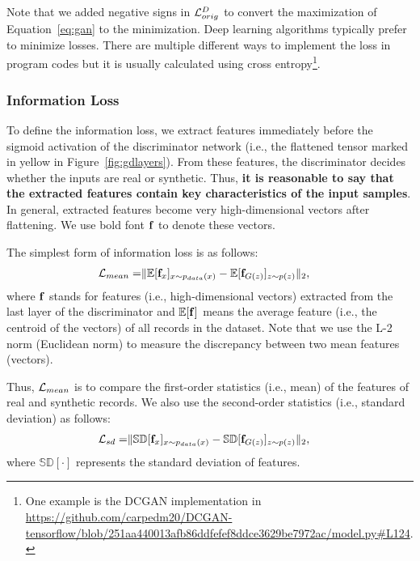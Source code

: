 Note that we added negative signs in $\mathcal{L}_{orig}^{D}$ to convert the maximization of Equation~\ref{eq:gan} to the minimization. Deep learning algorithms typically prefer to minimize losses. There are multiple different ways to implement the loss in program codes but it is usually calculated using cross entropy\footnote{One example is the DCGAN implementation in \url{https://github.com/carpedm20/DCGAN-tensorflow/blob/251aa440013afb86ddfefef8ddce3629be7972ac/model.py#L124}.}.

\subsubsection{Information Loss}
To define the information loss, we extract features immediately before the sigmoid activation of the discriminator network (i.e., the flattened tensor marked in yellow in Figure~\ref{fig:gdlayers}). From these features, the discriminator decides whether the inputs are real or synthetic. Thus, \textbf{it is reasonable to say that the extracted features contain key characteristics of the input samples}. In general, extracted features become very high-dimensional vectors after flattening. We use bold font $\mathbf{f}$ to denote these vectors.

The simplest form of information loss is as follows:
\begin{equation}\label{eq:mean}\begin{aligned}
\mathcal{L}_{mean} =  & \| \mathbb{E}[\mathbf{f}_x]_{x \sim p_{data}(x)} - \mathbb{E}[\mathbf{f}_{G(z)}]_{z \sim p(z)}\|_2,
\end{aligned}\end{equation}
where $\mathbf{f}$ stands for features (i.e., high-dimensional vectors) extracted from the last layer of the discriminator and $\mathbb{E}[\mathbf{f}]$ means the average feature (i.e., the centroid of the vectors) of all records in the dataset. Note that we use the L-2 norm (Euclidean norm) to measure the discrepancy between two mean features (vectors).

Thus, $\mathcal{L}_{mean}$ is to compare the first-order statistics (i.e., mean) of the features of real and synthetic records. We also use the second-order statistics (i.e., standard deviation) as follows:
\begin{equation}\label{eq:std}\begin{aligned}
\mathcal{L}_{sd} =  & \| \mathbb{SD}[\mathbf{f}_x]_{x \sim p_{data}(x)} - \mathbb{SD}[\mathbf{f}_{G(z)}]_{z \sim p(z)}\|_2,
\end{aligned}\end{equation}
where $\mathbb{SD}[\cdot]$ represents the standard deviation of features.

